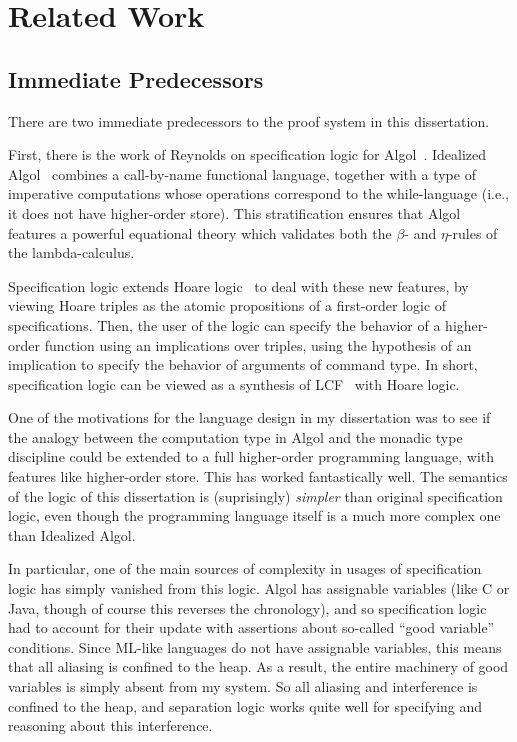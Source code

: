\section{Related Work}

\subsection{Immediate Predecessors}

There are two immediate predecessors to the proof system in this
dissertation. 

First, there is the work of Reynolds on specification logic for
Algol~\cite{spec-logic}. Idealized Algol~\cite{idealized-algol}
combines a call-by-name functional language, together with a type of
imperative computations whose operations correspond to the
while-language (i.e., it does not have higher-order store). This
stratification ensures that Algol features a powerful equational
theory which validates both the $\beta$- and $\eta$-rules of the
lambda-calculus. 

Specification logic extends Hoare logic~\cite{hoare-logic} to deal
with these new features, by viewing Hoare triples as the atomic
propositions of a first-order logic of specifications. Then, the user
of the logic can specify the behavior of a higher-order function using
an implications over triples, using the hypothesis of an implication
to specify the behavior of arguments of command type. In short,
specification logic can be viewed as a synthesis of LCF~\cite{lcf} with
  Hoare logic.

One of the motivations for the language design in my dissertation was
to see if the analogy between the computation type in Algol and the
monadic type discipline could be extended to a full higher-order
programming language, with features like higher-order store. This has
worked fantastically well. The semantics of the logic of this
dissertation is (suprisingly) \emph{simpler} than original
specification logic, even though the programming language itself is a
much more complex one than Idealized Algol.

In particular, one of the main sources of complexity in usages of
specification logic has simply vanished from this logic. Algol has
assignable variables (like C or Java, though of course this reverses
the chronology), and so specification logic had to account for their
update with assertions about so-called ``good variable''
conditions. Since ML-like languages do not have assignable variables,
this means that all aliasing is confined to the heap. As a result, the
entire machinery of good variables is simply absent from my system.
So all aliasing and interference is confined to the heap, and
separation logic works quite well for specifying and reasoning about
this interference.

